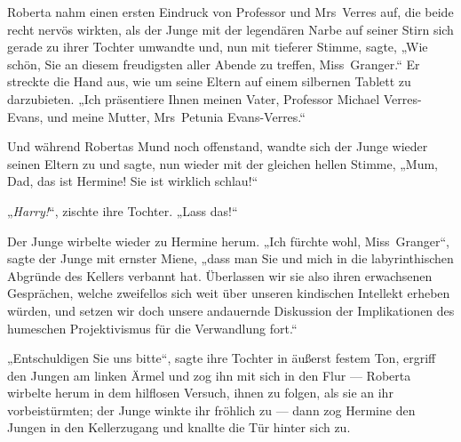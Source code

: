 Roberta nahm einen ersten Eindruck von Professor und Mrs~Verres auf, die beide recht nervös wirkten, als der Junge mit der legendären Narbe auf seiner Stirn sich gerade zu ihrer Tochter umwandte und, nun mit tieferer Stimme, sagte,
„Wie schön, Sie an diesem freudigsten aller Abende zu treffen, Miss~Granger.“ Er streckte die Hand aus, wie um seine Eltern auf einem silbernen Tablett zu darzubieten.
„Ich präsentiere Ihnen meinen Vater, Professor Michael Verres-Evans, und meine Mutter, Mrs~Petunia Evans-Verres.“

Und während Robertas Mund noch offenstand, wandte sich der Junge wieder seinen Eltern zu und sagte, nun wieder mit der gleichen hellen Stimme,
„Mum, Dad, das ist Hermine! Sie ist wirklich schlau!“

„\emph{Harry!}“, zischte ihre Tochter.
„Lass das!“

Der Junge wirbelte wieder zu Hermine herum.
„Ich fürchte wohl, Miss~Granger“, sagte der Junge mit ernster Miene, „dass man Sie und mich in die labyrinthischen Abgründe des Kellers verbannt hat. Überlassen wir sie also ihren erwachsenen Gesprächen, welche zweifellos sich weit über unseren kindischen Intellekt erheben würden, und setzen wir doch unsere andauernde Diskussion der Implikationen des humeschen Projektivismus für die Verwandlung fort.“

„Entschuldigen Sie uns bitte“, sagte ihre Tochter in äußerst festem Ton, ergriff den Jungen am linken Ärmel und zog ihn mit sich in den Flur — Roberta wirbelte herum in dem hilflosen Versuch, ihnen zu folgen, als sie an ihr vorbeistürmten; der Junge winkte ihr fröhlich zu — dann zog Hermine den Jungen in den Kellerzugang und knallte die Tür hinter sich zu.

